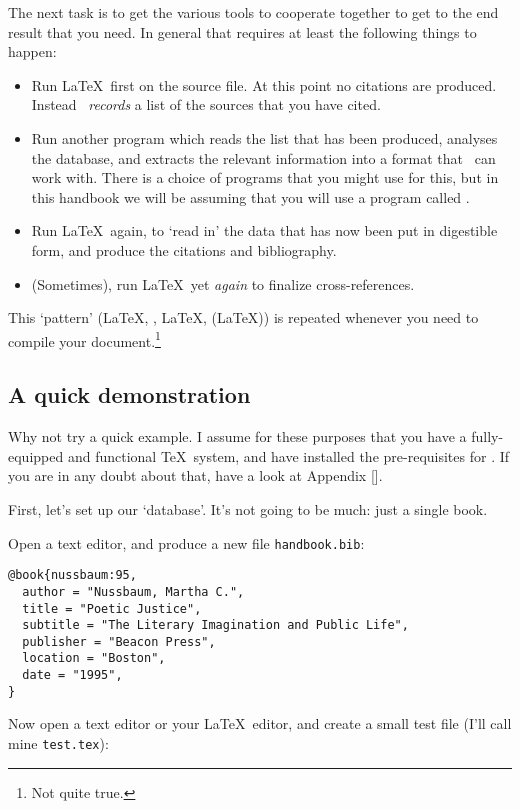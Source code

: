 The next task is to get the various tools to cooperate together to get to the end result that you need. In general that requires at least the following things to happen:
\begin{itemize}
\item Run \LaTeX\ first on the source file. At this point no citations are produced. Instead \biblatex\ \emph{records} a list of the sources that you have cited.
\item Run another program which reads the list that has been produced, analyses the database, and extracts the relevant information into a format that \biblatex\ can work with. There is a choice of programs that you might use for this, but in this handbook we will be assuming that you will use a program called .
\item Run \LaTeX\ again, to `read in' the data that has now been put in digestible form, and produce the citations and bibliography.
\item (Sometimes), run \LaTeX\ yet \emph{again} to finalize cross-references.
\end{itemize}

This `pattern' (\LaTeX, , \LaTeX, (\LaTeX)) is repeated whenever you need to compile your document.\footnote{Not quite true.}

\subsection{A quick demonstration\label{neophyte:example}}

Why not try a quick example. I assume for these purposes that you have a fully-equipped and functional \TeX\ system, and have installed the pre-requisites for \biblatex. If you are in any doubt about that, have a look at Appendix [].

First, let's set up our `database'. It's not going to be much: just a single book.

Open a text editor, and produce a new file \texttt{handbook.bib}:
\begin{verbatim}
@book{nussbaum:95,
  author = "Nussbaum, Martha C.",
  title = "Poetic Justice",
  subtitle = "The Literary Imagination and Public Life",
  publisher = "Beacon Press",
  location = "Boston",
  date = "1995",
}
\end{verbatim}

Now open a text editor or your \LaTeX\ editor, and create a small test file (I'll call mine \texttt{test.tex}):

